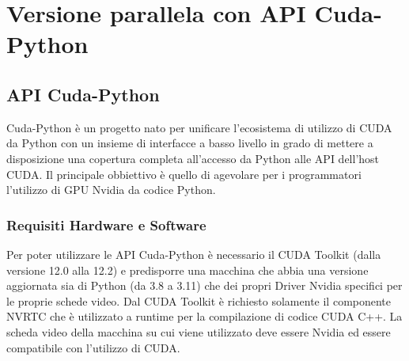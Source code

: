 \documentclass[12pt,a4paper]{report}
\begin{document}
\chapter{Versione parallela con API Cuda-Python} 

\section{API Cuda-Python}
Cuda-Python è un progetto nato per unificare l'ecosistema di utilizzo di CUDA da Python con un insieme di interfacce a basso livello in grado di mettere a disposizione una copertura completa all'accesso da Python alle API dell'host CUDA. Il principale obbiettivo è quello di agevolare per i programmatori l'utilizzo di GPU Nvidia da codice Python.

\subsection{Requisiti Hardware e Software}
Per poter utilizzare le API Cuda-Python è necessario il CUDA Toolkit (dalla versione 12.0 alla 12.2) e predisporre una macchina che abbia una versione aggiornata sia di Python (da 3.8 a 3.11) che dei propri Driver Nvidia specifici per le proprie schede video. \newline
Dal CUDA Toolkit è richiesto solamente il componente NVRTC che è utilizzato a runtime per la compilazione di codice CUDA C++. \newline
La scheda video della macchina su cui viene utilizzato deve essere Nvidia ed essere compatibile con l'utilizzo di CUDA.
\end{document}
